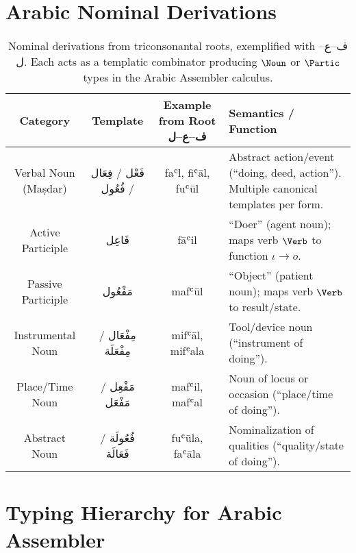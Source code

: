\documentclass[12pt]{article}
\begin{document}
\section{Arabic Nominal Derivations}
\label{app:nominals}
\renewcommand{\arraystretch}{1.3}
\begin{table}[h!]
\centering
\begin{tabular}{|c|c|c|p{5.5cm}|}
\hline
Category & Template & Example from Root ف–ع–ل & Semantics / Function \\
\hline
Verbal Noun (Maṣdar) & فَعْل / فِعَال / فُعُول & faʿl, fiʿāl, fuʿūl & Abstract action/event (“doing, deed, action”). Multiple canonical templates per form. \\
\hline
Active Participle & فَاعِل & fāʿil & “Doer” (agent noun); maps verb $\Verb$ to function $\iota \to o$. \\
\hline
Passive Participle & مَفْعُول & mafʿūl & “Object” (patient noun); maps verb $\Verb$ to result/state. \\
\hline
Instrumental Noun & مِفْعَال / مِفْعَلَة & mifʿāl, mifʿala & Tool/device noun (“instrument of doing”). \\
\hline
Place/Time Noun & مَفْعِل / مَفْعَل & mafʿil, mafʿal & Noun of locus or occasion (“place/time of doing”). \\
\hline
Abstract Noun & فُعُولَة / فَعَالَة & fuʿūla, faʿāla & Nominalization of qualities (“quality/state of doing”). \\
\hline
\end{tabular}
\caption{Nominal derivations from triconsonantal roots, exemplified with ف–ع–ل. Each acts as a templatic combinator producing $\Noun$ or $\Partic$ types in the Arabic Assembler calculus.}
\end{table}

\section{Typing Hierarchy for Arabic Assembler}
\label{app:hierarchy}
\begin{center}
\end{center}
\end{document}
